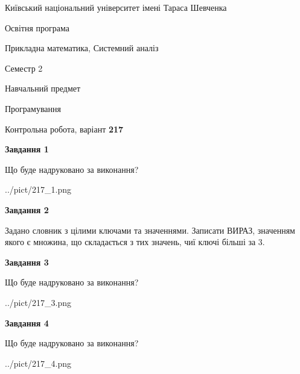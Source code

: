 \documentclass[12pt, ukrainian]{article}
\begin{document}
{{\begin {small}\par
{ \center  Київський національний університет імені Тараса Шевченка \par}
{\parbox {5 cm}{Освітня програма \hfill}{\parbox {8 cm}{Прикладна математика, Системний аналіз \hfill}}\parbox {5 cm}{\hfill Семестр 2}}\par
{\parbox {5 cm} {Навчальний предмет \hfill}\parbox {7 cm}{Програмування \hfill}\parbox {6cm}{\hfill}\par}\vspace{-7pt} \end{small}}{\center Контрольна робота, варіант  \No \textbf
{ 217 }\par}}
{
\begin {large}
{\begin {center}\textbf{Завдання 1}\end {center}}\par
Що буде надруковано за виконання?\par\par
\begin{center}
	{../pict/217_1.png}
\end{center}
\newpage

{\begin {center}\textbf{Завдання 2}\end {center}}\par
Задано словник  з цілими ключами та значеннями. Записати ВИРАЗ, значенням якого є множина, що складається  з тих значень, чиї ключі більші за 3.\par
\newpage

{\begin {center}\textbf{Завдання 3}\end {center}}\par
Що буде надруковано за виконання?
\begin{center}
	{../pict/217_3.png}
\end{center}
\newpage

{\begin {center}\textbf{Завдання 4}\end {center}}\par
Що буде надруковано за виконання?\par
\begin{center}
	{../pict/217_4.png}
\end{center}
\newpage


\end{large}}
\end{document}
